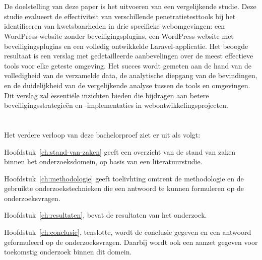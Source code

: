 \section{}%
\label{sec:onderzoeksdoelstelling}
De doelstelling van deze paper is het uitvoeren van een vergelijkende studie. Deze studie evalueert de effectiviteit van 
verschillende penetratietesttools bij het identificeren van kwetsbaarheden in drie specifieke webomgevingen: een WordPress-website 
zonder beveiligingsplugins, een WordPress-website met beveiligingsplugins en een volledig ontwikkelde Laravel-applicatie.
Het beoogde resultaat is een verslag met gedetailleerde aanbevelingen over de meest effectieve tools voor elke geteste 
omgeving. Het succes wordt gemeten aan de hand van de volledigheid van de verzamelde data, de analytische diepgang van de bevindingen, 
en de duidelijkheid van de vergelijkende analyse tussen de tools en omgevingen. Dit verslag zal essentiële inzichten bieden die 
bijdragen aan betere beveiligingsstrategieën en -implementaties in webontwikkelingsprojecten.
\section{}%
\label{sec:opzet-bachelorproef}


Het verdere verloop van deze bachelorproef ziet er uit als volgt:

Hoofdstuk~\ref{ch:stand-van-zaken} geeft een overzicht van de stand van zaken binnen het onderzoeksdomein, op basis van een literatuurstudie.

Hoofdstuk~\ref{ch:methodologie} geeft toelivhting omtrent de methodologie en de gebruikte onderzoekstechnieken die een antwoord te kunnen formuleren op de onderzoeksvragen.

Hoofdstuk~\ref{ch:resultaten}, bevat de resultaten van het onderzoek.

Hoofdstuk~\ref{ch:conclusie}, tenslotte, wordt de conclusie gegeven en een antwoord geformuleerd op de onderzoeksvragen. Daarbij wordt ook een aanzet gegeven voor toekomstig onderzoek binnen dit domein.